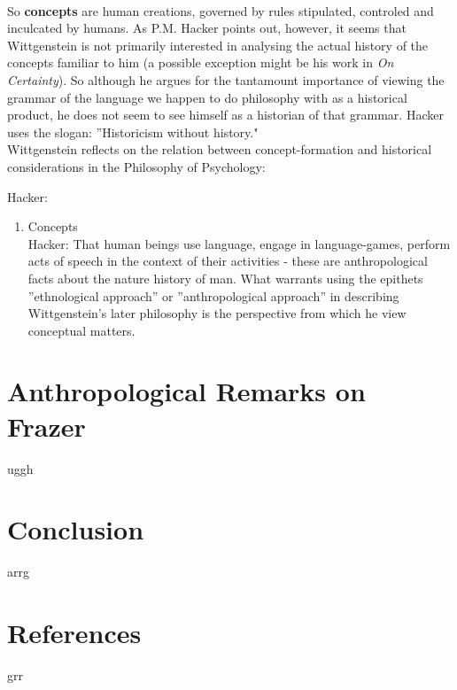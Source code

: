 \documentclass{article}
\begin{document}

\paragraph{} So \textbf{concepts} are human creations, governed by rules stipulated, controled and inculcated by humans. As P.M. Hacker points out, however, it seems that Wittgenstein is not primarily interested in analysing the actual history of the concepts familiar to him (a possible exception might be his work in \textit{On Certainty}). So although he argues for the tantamount importance of viewing the grammar of the language we happen to do philosophy with as a historical product, he does not seem to see himself as a historian of that grammar. Hacker uses the slogan: ''Historicism without history."\\
Wittgenstein reflects on the relation between concept-formation and historical considerations in the Philosophy of Psychology:


\hypertarget{sec2}{Hacker:}
\begin{enumerate}
\item Concepts\\
Hacker: That human beings use language, engage in language-games, perform acts of speech in the context of their activities - these are anthropological facts about the nature history of man. What warrants using the epithets ''ethnological approach'' or ''anthropological approach'' in describing Wittgenstein's later philosophy is the perspective from which he view conceptual matters. 
\end{enumerate}
\section{Anthropological Remarks on Frazer}
\hypertarget{sec3}{uggh}
\section{Conclusion}
\hypertarget{sec4}{arrg}
\section{References}
\hypertarget{sec5}{grr}
\end{document}
